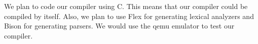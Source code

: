 We plan to code our compiler using C. This means that our compiler 
could be compiled by itself. Also, we plan to use Flex for generating 
lexical analyzers and Bison for generating parsers. We would use the qemu
emulator to test our compiler.